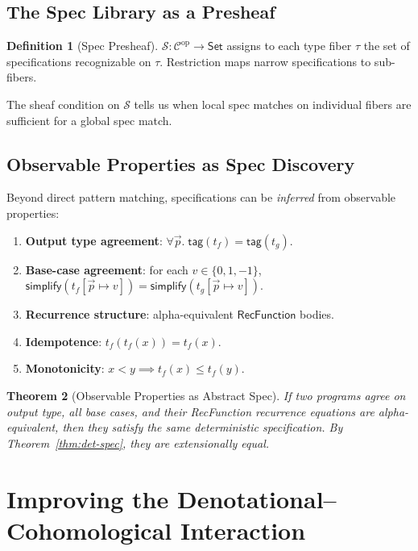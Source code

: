 \documentclass[11pt,a4paper]{report}
\theoremstyle{definition}
\newtheorem{definition}{Definition}[chapter]
\theoremstyle{plain}
\newtheorem{theorem}[definition]{Theorem}
\begin{document}
\subsection{The Spec Library as a Presheaf}

\begin{definition}[Spec Presheaf]
$\mathcal{S} : \mathcal{C}^{\mathrm{op}} \to \mathsf{Set}$ assigns
to each type fiber $\tau$ the set of specifications recognizable
on $\tau$.  Restriction maps narrow specifications to sub-fibers.
\end{definition}

The sheaf condition on $\mathcal{S}$ tells us when local spec
matches on individual fibers are sufficient for a global spec
match.

\subsection{Observable Properties as Spec Discovery}

Beyond direct pattern matching, specifications can be
\emph{inferred} from observable properties:

\begin{enumerate}
  \item \textbf{Output type agreement}:
    $\forall \vec{p}.\; \mathsf{tag}(t_f) = \mathsf{tag}(t_g)$.
  \item \textbf{Base-case agreement}: for each $v \in \{0, 1, -1\}$,
    $\mathsf{simplify}(t_f[\vec{p} \mapsto v])
    = \mathsf{simplify}(t_g[\vec{p} \mapsto v])$.
  \item \textbf{Recurrence structure}: alpha-equivalent
    $\mathsf{RecFunction}$ bodies.
  \item \textbf{Idempotence}: $t_f(t_f(x)) = t_f(x)$.
  \item \textbf{Monotonicity}: $x < y \implies t_f(x) \leq t_f(y)$.
\end{enumerate}

\begin{theorem}[Observable Properties as Abstract Spec]
\label{thm:obs-spec}
If two programs agree on output type, all base cases, and their
RecFunction recurrence equations are alpha-equivalent, then they
satisfy the same deterministic specification.  By
Theorem~\ref{thm:det-spec}, they are extensionally equal.
\end{theorem}


\section{Improving the Denotational--Cohomological Interaction}
\label{sec:denot-cohom-interaction}
\end{document}
